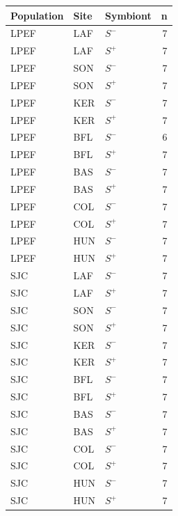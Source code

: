 \begin{tabular}{lllr}
\hline
Population & Site & Symbiont & n \\
\hline

LPEF & LAF & $S^{-}$ & 7 \\
LPEF & LAF & $S^{+}$ & 7 \\
LPEF & SON & $S^{-}$ & 7 \\
LPEF & SON & $S^{+}$ & 7 \\
LPEF & KER & $S^{-}$ & 7 \\
LPEF & KER & $S^{+}$ & 7 \\
LPEF & BFL & $S^{-}$ & 6 \\
LPEF & BFL & $S^{+}$ & 7 \\
LPEF & BAS & $S^{-}$ & 7 \\
LPEF & BAS & $S^{+}$ & 7 \\
LPEF & COL & $S^{-}$ & 7 \\
LPEF & COL & $S^{+}$ & 7 \\
LPEF & HUN & $S^{-}$ & 7 \\
LPEF & HUN & $S^{+}$ & 7 \\

SJC & LAF & $S^{-}$ & 7 \\
SJC & LAF & $S^{+}$ & 7 \\
SJC & SON & $S^{-}$ & 7 \\
SJC & SON & $S^{+}$ & 7 \\
SJC & KER & $S^{-}$ & 7 \\
SJC & KER & $S^{+}$ & 7 \\
SJC & BFL & $S^{-}$ & 7 \\
SJC & BFL & $S^{+}$ & 7 \\
SJC & BAS & $S^{-}$ & 7 \\
SJC & BAS & $S^{+}$ & 7 \\
SJC & COL & $S^{-}$ & 7 \\
SJC & COL & $S^{+}$ & 7 \\
SJC & HUN & $S^{-}$ & 7 \\
SJC & HUN & $S^{+}$ & 7 \\

\hline
\end{tabular}
